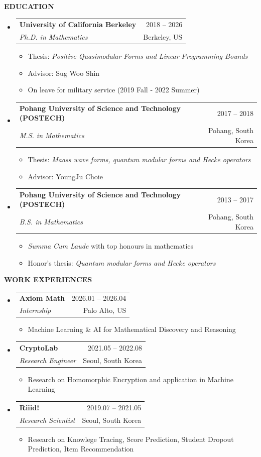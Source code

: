 \documentclass[letterpaper,11pt]{article}
\makeatletter
\newcommand{\resitem}[1]{\item #1}
\newcommand{\resheading}[1]{%
  \par\addvspace{10pt}%
  {\sffamily\bfseries\large\color{accent}\MakeUppercase{#1}}\par\nobreak
  \vspace{2pt}{\color{accent!35}\hrule height 0.7pt}\par\nobreak\vspace{5pt}}
\newcommand{\ressubheading}[4]{%
  \par\addvspace{3pt}%
  \begin{tabular*}{\linewidth}{@{}l@{\extracolsep{\fill}}r@{}}
    \textbf{#1} & {\sffamily\small\color{accent}#4} \\
    \textit{#3} & {\small\color{muted}#2} \\
  \end{tabular*}\par\nobreak\vspace{1pt}}
\makeatother
\begin{document}
\resheading{Education}
\begin{itemize}
\item[]
	\ressubheading{University of California Berkeley}{Berkeley, US}{Ph.D. in Mathematics}{2018 -- 2026}
	\begin{itemize}
		\resitem{Thesis: \emph{Positive Quasimodular Forms and Linear Programming Bounds}}
		\resitem{Advisor: Sug Woo Shin}
		\resitem{On leave for military service (2019 Fall - 2022 Summer)}
	\end{itemize}

\item[]
	\ressubheading{Pohang University of Science and Technology (POSTECH)}{Pohang, South Korea}{M.S. in Mathematics}{2017 -- 2018}
	\begin{itemize}
		\resitem{Thesis: \emph{Maass wave forms, quantum modular forms and Hecke operators}}
		\resitem{Advisor: YoungJu Choie}
	\end{itemize}

\item[]
	\ressubheading{Pohang University of Science and Technology (POSTECH)}{Pohang, South Korea}{B.S. in Mathematics}{2013 -- 2017}
	\begin{itemize}
		\resitem{\emph{Summa Cum Laude} with top honours in mathematics} 
		\resitem{Honor's thesis: \emph{Quantum modular forms and Hecke operators}}
	\end{itemize}

\end{itemize}


\resheading{Work Experiences}
\begin{itemize}
\item[]
	\ressubheading{Axiom Math}{Palo Alto, US}{Internship}{2026.01 -- 2026.04}
	\begin{itemize}
		\resitem{Machine Learning \& AI for Mathematical Discovery and Reasoning}
	\end{itemize}

\item[]
	\ressubheading{CryptoLab}{Seoul, South Korea}{Research Engineer}{2021.05 -- 2022.08}
	\begin{itemize}
		\resitem{Research on Homomorphic Encryption and application in Machine Learning}
	\end{itemize}

\item[]
	\ressubheading{Riiid!}{Seoul, South Korea}{Research Scientist}{2019.07 -- 2021.05}
	\begin{itemize}
		\resitem{Research on Knowlege Tracing, Score Prediction, Student Dropout Prediction, Item Recommendation}
	\end{itemize}
\end{itemize}
\end{document}
